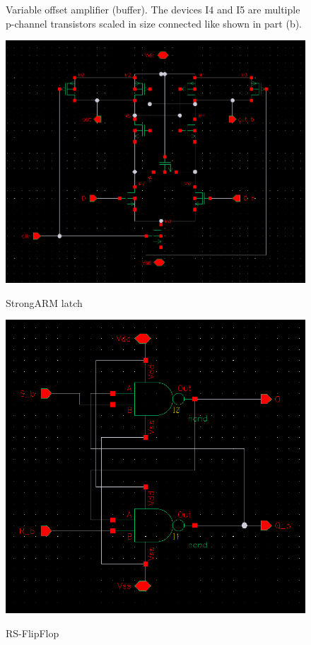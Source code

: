 \begin{figure}[H]
  \caption{Variable offset amplifier (buffer). The devices I4 and I5 are multiple p-channel transistors scaled in size connected like shown in part (b). }
  \label{fig:voa}
\end{figure}

\begin{figure}[H]
  \centering
  {\includegraphics[scale=0.6]{schematics/strongARM.png}}
  \caption{StrongARM latch}
  \label{fig:strongARM}
\end{figure}

\begin{figure}[H]
  \centering
  {\includegraphics[scale=0.5]{schematics/rs_flipflop.png}}
  \caption{RS-FlipFlop}
  \label{fig:rs_flipflop}
\end{figure}
